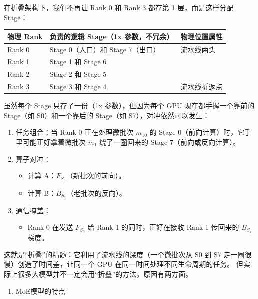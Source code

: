 在折叠架构下，我们不再让 Rank 0 和 Rank 3 都存第 1 层，而是这样分配 Stage：

\begin{longtable}[]{@{}
  >{\raggedright\arraybackslash}p{}
  >{\raggedright\arraybackslash}p{}
  >{\raggedright\arraybackslash}p{}@{}}
\toprule
物理 Rank & 负责的逻辑 Stage（1x 参数，不冗余） & 物理位置属性 \\
\midrule
\endhead
Rank 0 & Stage 0（入口）和 Stage 7（出口） & 流水线两头 \\
Rank 1 & Stage 1 和 Stage 6 & \\
Rank 2 & Stage 2 和 Stage 5 & \\
Rank 3 & Stage 3 和 Stage 4 & 流水线折返点 \\
\bottomrule
\end{longtable}

虽然每个 Stage 只存了一份（1x 参数），但因为每个 GPU 现在都手握一个靠前的 Stage（如 S0）和一个靠后的 Stage（如 S7），对冲依然可以发生：

\begin{enumerate}
\def\labelenumi{\arabic{enumi}.}
\tightlist
\item
  任务组合：当 Rank 0 正在处理微批次 \(m_{10}\) 的 Stage 0（前向计算）时，它手里可能正好拿着微批次 \(m_1\) 绕了一圈回来的 Stage 7（前向或反向计算）。
\item
  算子对冲：

  \begin{itemize}
  \tightlist
  \item
    计算 A：\(F_{S_0}\)（新批次的前向）。
  \item
    计算 B：\(B_{S_7}\)（老批次的反向）。
  \end{itemize}
\item
  通信掩盖：

  \begin{itemize}
  \tightlist
  \item
    Rank 0 在发送 \(F_{S_0}\) 给 Rank 1 的同时，正好在接收 Rank 1 传回来的 \(B_{S_7}\) 梯度。
  \end{itemize}
\end{enumerate}

这就是``折叠''的精髓：它利用了流水线的深度（一个微批次从 S0 到 S7 走一圈很慢）创造了时间差，让同一个 GPU 在同一时间处理不同生命周期的任务。
但实际上很多大模型并不一定会用``折叠''的方法，原因有两方面。

\begin{enumerate}
\def\labelenumi{\arabic{enumi}.}
\tightlist
\item
  MoE模型的特点
\end{enumerate}

